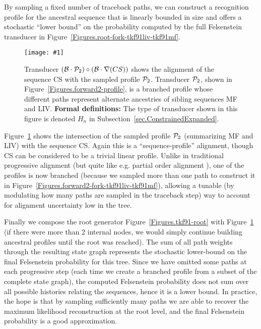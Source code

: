 \documentclass{article}
\newcommand{\secref}[1]{Subsection~\ref{sec.#1}}
\newcommand{\figref}[1]{Figure~\ref{Figures.#1}}
\newcommand{\figlabel}[1]{\label{Figures.#1}}
\newcommand{\easyfig}[4]{
\begin{figure}
\texttt{[image: \#1]}
\caption{ \figlabel{#3} #4}
\end{figure}}
\newcommand{\widepngfig}[2]{\easyfig{#1.png}{width=\textwidth}{#1}{#2}}
\newcommand{\needfig}[1]{{\bf Need figure: } #1 }
\newcommand\tkf{{\cal B}}
\newcommand\profile{{\cal P}}
\newcommand\formaldefs{{\bf Formal definitions: }}
\newcommand\fork{\circ}
\newcommand\recognize{\nabla}
\begin{document}
By sampling a fixed number of traceback paths,
we can construct a recognition profile for the ancestral sequence
that is linearly bounded in size and offers a stochastic ``lower bound''
on the probability computed by the full Felsenstein transducer in \figref{root-fork-tkf91liv-tkf91mf}.

\widepngfig{fork-tkf91forward2-tkf91cs}{Transducer $(\tkf \cdot \profile_2)\fork(\tkf \cdot \recognize(CS))$ shows the alignment of the sequence CS with the sampled profile $\profile_2$.
Transducer $\profile_2$, shown in \figref{forward2-profile}, is a branched profile whose different paths represent alternate ancestries of sibling sequences MF and LIV.
\formaldefs
The type of transducer shown in this figure is denoted $H_n$ in \secref{ConstrainedExpanded}.
}

\figref{fork-tkf91forward2-tkf91cs} shows the intersection of the sampled profile $\profile_2$ (summarizing MF and LIV) with the sequence CS.  
 Again this is a ``sequence-profile'' alignment, though CS can be considered to be a 
trivial linear profile.  
Unlike in traditional progressive alignment
 (but quite like e.g. partial order alignment \cite{LeeGrassoSharlow2002}),
one of the profiles is now branched
 (because we sampled more than one path to construct it in \figref{forward2-fork-tkf91liv-tkf91mf}), allowing a tunable (by modulating how many paths are sampled in the traceback step)
way to account for alignment uncertainty low in the tree.  


Finally we compose the root generator \figref{tkf91-root}
with \figref{fork-tkf91forward2-tkf91cs} (if there were more than 2 internal nodes,
we would simply continue building ancestral profiles until the root was reached).
The sum of all path weights through the resulting state graph
 represents the stochastic lower-bound
on the final Felsenstein probability for this tree.
Since we have omitted some paths at each progressive step
 (each time we create a branched profile from a subset of the complete state graph),
the computed Felsenstein probability does not sum over all possible histories
relating the sequences, hence it is a lower bound.  
In practice, the hope is that by sampling sufficiently many paths we are able to 
recover the maximum likelihood reconstruction at the root level, and the
final Felsenstein probability is a good approximation. 
\end{document}
